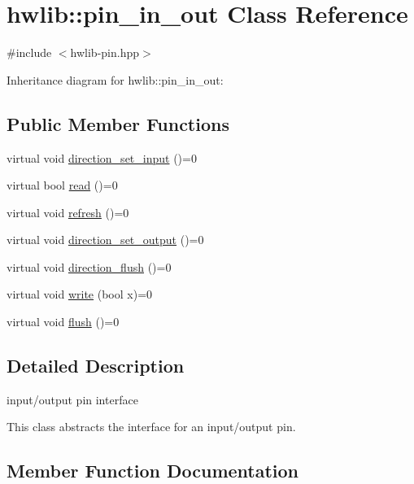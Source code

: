 \hypertarget{classhwlib_1_1pin__in__out}{}\section{hwlib\+:\+:pin\+\_\+in\+\_\+out Class Reference}
\label{classhwlib_1_1pin__in__out}


{\ttfamily \#include $<$hwlib-\/pin.\+hpp$>$}



Inheritance diagram for hwlib\+:\+:pin\+\_\+in\+\_\+out\+:
\subsection*{Public Member Functions}
\begin{DoxyCompactItemize}
\item 
virtual void \hyperlink{classhwlib_1_1pin__in__out_a54ce1a5086d3c9e7b868511b1d46acd0}{direction\+\_\+set\+\_\+input} ()=0
\item 
virtual bool \hyperlink{classhwlib_1_1pin__in__out_a5caebc7ab9fe49b7e020b89f0a2cf892}{read} ()=0
\item 
virtual void \hyperlink{classhwlib_1_1pin__in__out_a8815baac4e5193ec68795956f5e363a6}{refresh} ()=0
\item 
virtual void \hyperlink{classhwlib_1_1pin__in__out_ad08a5f5e9a4c3aadaa7c665b98f2418e}{direction\+\_\+set\+\_\+output} ()=0
\item 
virtual void \hyperlink{classhwlib_1_1pin__in__out_a86ef2b296683d8c0133280075c82cb51}{direction\+\_\+flush} ()=0
\item 
virtual void \hyperlink{classhwlib_1_1pin__in__out_aa5e2adcb5707f86c20b6306fc09f1582}{write} (bool x)=0
\item 
virtual void \hyperlink{classhwlib_1_1pin__in__out_a5207c9e30f0c88e4c052952397c2da88}{flush} ()=0
\end{DoxyCompactItemize}


\subsection{Detailed Description}
input/output pin interface

This class abstracts the interface for an input/output pin. 

\subsection{Member Function Documentation}
\mbox{\label{classhwlib_1_1pin__in__out_a86ef2b296683d8c0133280075c82cb51}} 
